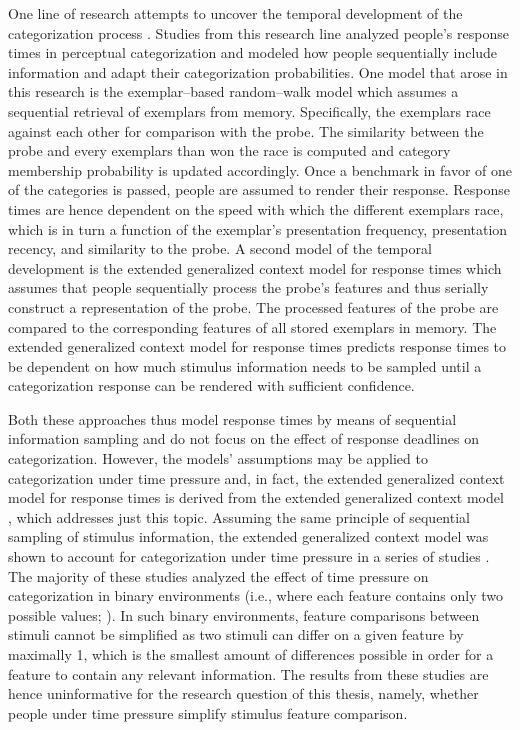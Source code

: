 \documentclass[a4paper,man,natbib]{apa6}
\begin{document}
One line of research attempts to uncover the temporal development of the categorization process \citep{lamberts2000information, lamberts2002feature, nosofsky1997exemplar}. Studies from this research line analyzed people's response times in perceptual categorization and modeled how people sequentially include information and adapt their categorization probabilities. One model that arose in this research is the exemplar--based random--walk model \citep{nosofsky1997exemplar} which assumes a sequential retrieval of exemplars from memory. Specifically, the exemplars race against each other for comparison with the probe. The similarity between the probe and every exemplars than won the race is computed and category membership probability is updated accordingly. Once a benchmark in favor of one of the categories is passed, people are assumed to render their response. Response times are hence dependent on the speed with which the different exemplars race, which is in turn a function of the exemplar's presentation frequency, presentation recency, and similarity to the probe. A second model of the temporal development is the extended generalized context model for response times \citep{lamberts2000information, lamberts2002feature} which assumes that people sequentially process the probe's features and thus serially construct a representation of the probe. The processed features of the probe are compared to the corresponding features of all stored exemplars in memory. The extended generalized context model for response times predicts response times to be dependent on how much stimulus information needs to be sampled until a categorization response can be rendered with sufficient confidence.

Both these approaches thus model response times by means of sequential information sampling and do not focus on the effect of response deadlines on categorization. However, the models' assumptions may be applied to categorization under time pressure and, in fact, the extended generalized context model for response times is derived from the extended generalized context model \citep{lamberts1995categorization}, which addresses just this topic. Assuming the same principle of sequential sampling of stimulus information, the extended generalized context model was shown to account for categorization under time pressure in a series of studies \citep{lamberts1995categorization, lamberts1998time, lamberts1999building, lamberts1999categorization, lamberts1997fast}. 
The majority of these studies analyzed the effect of time pressure on categorization in binary environments (i.e., where each feature contains only two possible values; \citealp{lamberts1995categorization, lamberts1998time, lamberts1999building, lamberts1999categorization}). In such binary environments, feature comparisons between stimuli cannot be simplified as two stimuli can differ on a given feature by maximally 1, which is the smallest amount of differences possible in order for a feature to contain any relevant information. The results from these studies are hence uninformative for the research question of this thesis, namely, whether people under time pressure simplify stimulus feature comparison. 
\end{document}
